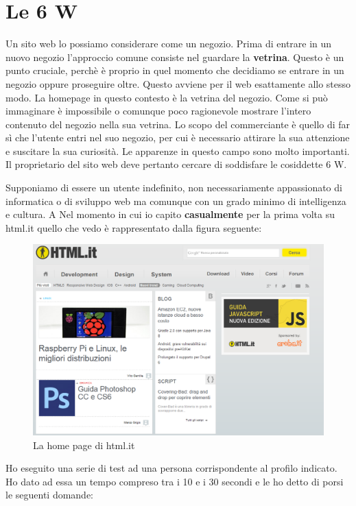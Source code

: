 \section{Le 6 W}

Un sito web lo possiamo considerare come un negozio. Prima di entrare in un nuovo negozio l'approccio comune consiste nel guardare la \textbf{vetrina}. Questo è un punto cruciale, perchè è proprio in quel momento che decidiamo se entrare in un negozio oppure proseguire oltre. Questo avviene per il web esattamente allo stesso modo. La homepage in questo contesto è la vetrina del negozio. Come si può immaginare è impossibile o comunque poco ragionevole mostrare l'intero contenuto del negozio nella sua vetrina. Lo scopo del commerciante è quello di far sì che l'utente entri nel suo negozio, per cui è necessario attirare la sua attenzione e suscitare la sua curiosità. Le apparenze in questo campo sono molto importanti. Il proprietario del sito web deve pertanto cercare di soddisfare le cosiddette 6 W.

Supponiamo di essere un utente indefinito, non necessariamente appassionato di informatica o di sviluppo web ma comunque con un grado minimo di intelligenza e cultura. A Nel momento in cui io capito \textbf{casualmente} per la prima volta su html.it quello che vedo è rappresentato dalla figura seguente:

\begin{figure}[htpd]
\centering
\includegraphics[width=120mm]{images/home.png}
\caption{La home page di html.it}
\end{figure}

Ho eseguito una serie di test ad una persona corrispondente al profilo indicato. Ho dato ad essa un tempo compreso tra i 10 e i 30 secondi e le ho detto di porsi le seguenti domande:

